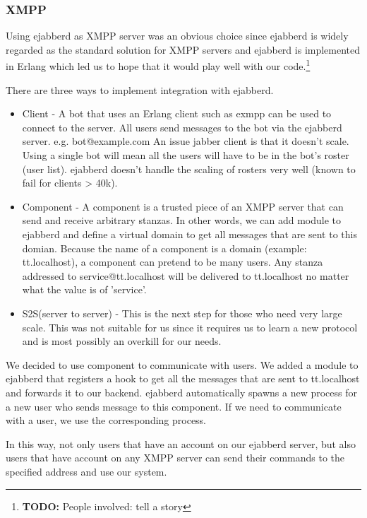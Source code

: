 \documentclass[11pt,a4paper]{report}
\newcommand{\todo}[1]{\footnote{{\color{red} {\bf TODO:} #1}}}
\begin{document}
\subsubsection{XMPP}
Using ejabberd as XMPP server was an obvious choice since ejabberd is widely
regarded as the standard solution for XMPP servers and ejabberd is implemented
in Erlang which led us to hope that it would play well with our code.\todo{People involved: tell a story}

There are three ways to implement integration with ejabberd.

\begin{itemize}
\item Client - A bot that uses an Erlang client such as exmpp can be used to connect to the server. 
All users send messages to the bot via the ejabberd server. e.g. bot@example.com
An issue jabber client is that it doesn’t scale. Using a single bot will mean all the users will have 
to be in the bot’s roster (user list). ejabberd doesn’t handle the scaling of rosters very well (known to fail for clients > 40k).
\item Component - A component is a trusted piece of an XMPP server that can send and receive arbitrary stanzas. 
In other words, we can add module to ejabberd and define a virtual domain to get all messages that are sent to this domian.  
Because the name of a component is a domain (example: tt.localhost), a component can pretend to be many users. 
Any stanza addressed to service@tt.localhost will be delivered to tt.localhost no matter what the value is of 'service'.
\item S2S(server to server) - This is the next step for those who need very large scale. This was not suitable for us  
since it requires us to learn a new protocol and is most possibly an overkill for our needs.

\end{itemize}

We decided to use component to communicate with users. We added a module to ejabberd that registers
 a hook to get all the messages that are sent to tt.localhost and forwards it to our backend. ejabberd
 automatically spawns a new process for a new user who sends message to this component.
 If we need to communicate with a user, we use the corresponding process.

In this way, not only users that have an account on our ejabberd server, but also users 
that have account on any XMPP server can send their commands to the specified address and use our system.  
\end{document}
